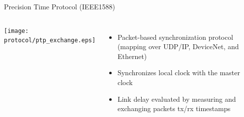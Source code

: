 \documentclass[compress,red]{beamer}
\begin{document}
\begin{frame}{Precision Time Protocol (IEEE1588)}

\begin{columns}[c]
  \column{1.5in}
      \begin{center}
	\texttt{[image: protocol/ptp\_exchange.eps]}
      \end{center}
  \column{2.5in}
      \begin{itemize}
	  \item Packet-based synchronization protocol (mapping over UDP/IP, DeviceNet, and Ethernet)
	  \item Synchronizes local clock with the master clock
	  \item Link delay evaluated by measuring and exchanging packets tx/rx timestamps
      \end{itemize}
  \end{columns}

\end{frame}
% 
\end{document}
